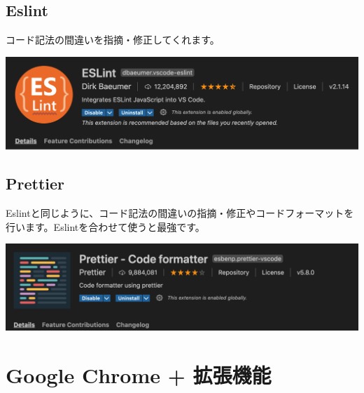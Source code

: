 \subsection{Eslint}
\keeplastskip{
  \label{sec:1-2-3}
  \par\nobreak
}

コード記法の間違いを指摘・修正してくれます。

\begin{reviewimage}[H]%
\includegraphics[width=1.0\maxwidth]{./images/01-createDevEnv/01_07vscodeExtension_eslint.png}%
\label{image:01-createDevEnv:01_07vscodeExtension_eslint}
\end{reviewimage}

\subsection{Prettier}
\keeplastskip{
  \label{sec:1-2-4}
  \par\nobreak
}

Eslintと同じように、コード記法の間違いの指摘・修正やコードフォーマットを行います。Eslintを合わせて使うと最強です。

\begin{reviewimage}[H]%
\includegraphics[width=1.0\maxwidth]{./images/01-createDevEnv/01_08vscodeExtension_prettier.png}%
\label{image:01-createDevEnv:01_08vscodeExtension_prettier}
\end{reviewimage}

\section{Google Chrome + 拡張機能}
\keeplastskip{
  \label{sec:1-3}
  \label{sec-chrome}
  \par\nobreak
}

